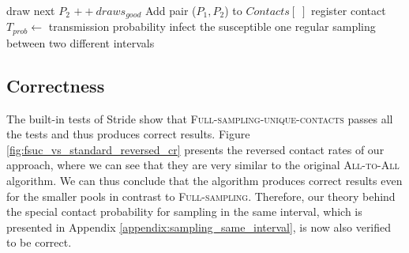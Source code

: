 \begin{algorithm}
\begin{algorithmic}[1]
                                    \State draw next $P_{2}$
                                \EndIf
                                \State $++draws_{good}$
                                \State Add pair ($P_{1}, P_{2}$) to $Contacts[\;]$
                            \EndWhile
                        \EndIf
                    \EndForeach
                        \State register contact
                            \State $T_{prob} \gets$ transmission probability
                                \State infect the susceptible one
                            \EndIf
                        \EndIf
                    \EndForeach
                \Else
                    \State regular sampling between two different intervals 
                \EndIf
            \EndFor
        \EndFor
    \EndIf
\end{algorithmic}
\end{algorithm}

\subsection{Correctness}
\label{subsec:correctness_fsuc}
The built-in tests of Stride show that \textsc{Full-sampling-unique-contacts} passes all the tests and thus produces correct results. Figure \ref{fig:fsuc_vs_standard_reversed_cr} presents the reversed contact rates of our approach, where we can see that they are very similar to the original \textsc{All-to-All} algorithm. We can thus conclude that the algorithm produces correct results even for the smaller pools in contrast to \textsc{Full-sampling}. Therefore, our theory behind the special contact probability for sampling in the same interval, which is presented in Appendix \ref{appendix:sampling_same_interval}, is now also verified to be correct.

